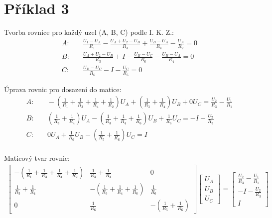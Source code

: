 \section{Příklad 3}


Tvorba rovnice pro každý uzel (A, B, C) podle I. K. Z.:
\nopagebreak
\begin{align*}
A: & \quad
\frac{U_1 - U_A}{R_1} - \frac{U_A + U_2 - U_B}{R_3} + \frac{U_B - U_A}{R_4} - \frac{U_A}{R_2} = 0 \\
B: & \quad \frac{U_A + U_2 - U_B}{R_3} + I - \frac{U_B - U_C}{R_6} - \frac{U_B - U_A}{R_4} = 0 \\
C: & \quad \frac{U_B - U_C}{R_6} - I - \frac{U_C}{R_5} = 0
\end{align*}

Úprava rovnic pro dosazení do matice:
\nopagebreak
\begin{align*}
A: & \quad
- (\frac{1}{R_1} + \frac{1}{R_3} + \frac{1}{R_4} + \frac{1}{R_2})U_A
+ (\frac{1}{R_3} + \frac{1}{R_4})U_B
+ 0 U_C
= \frac{U_2}{R_3} - \frac{U_1}{R_1} \\
B: & \quad
(\frac{1}{R_3} + \frac{1}{R_4})U_A
- (\frac{1}{R_3} + \frac{1}{R_4} + \frac{1}{R_6})U_B
+ \frac{1}{R_6} U_C
= -I-\frac{U_2}{R_3} \\
C: & \quad
0 U_A
+ \frac{1}{R_6}U_B
- (\frac{1}{R_5} + \frac{1}{R_6})U_C
= I \\
\end{align*}

Maticový tvar rovnic:
\nopagebreak
\begin{align*}
\begin{bmatrix}
-\left(\frac{1}{R_1} + \frac{1}{R_3} + \frac{1}{R_4} + \frac{1}{R_2}\right) & \frac{1}{R_3} + \frac{1}{R_4} & 0 \\
\frac{1}{R_3} + \frac{1}{R_4} & -\left(\frac{1}{R_3} + \frac{1}{R_4} + \frac{1}{R_6}\right) & \frac{1}{R_6} \\
0 & \frac{1}{R_6} & -\left(\frac{1}{R_5} + \frac{1}{R_6}\right)
\end{bmatrix}
\begin{bmatrix}
U_A \\
U_B \\
U_C
\end{bmatrix}
=
\begin{bmatrix}
\frac{U_2}{R_3} - \frac{U_1}{R_1} \\
-I - \frac{U_2}{R_3} \\
I
\end{bmatrix}
\end{align*}

